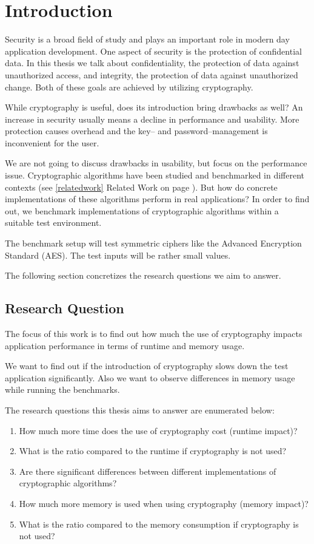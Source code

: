 \chapter{Introduction}

Security is a broad field of study and plays an important role in modern day application development.
One aspect of security is the protection of confidential data.
In this thesis we talk about confidentiality, the protection of data against unauthorized access, and integrity, the protection of data against unauthorized change.
Both of these goals are achieved by utilizing cryptography.

While cryptography is useful, does its introduction bring drawbacks as well?
An increase in security usually means a decline in performance and usability.
More protection causes overhead and the key-- and password--management is inconvenient for the user.

We are not going to discuss drawbacks in usability, but focus on the performance issue.
Cryptographic algorithms have been studied and benchmarked in different contexts (see \ref{relatedwork} Related Work on page \pageref{relatedwork}).
But how do concrete implementations of these algorithms perform in real applications?
In order to find out, we benchmark implementations of cryptographic algorithms within a suitable test environment.

The benchmark setup will test symmetric ciphers like the Advanced Encryption Standard (AES).
The test inputs will be rather small values.

The following section concretizes the research questions we aim to answer.

\section{Research Question}

The focus of this work is to find out how much the use of cryptography
impacts application performance in terms of runtime and memory
usage.

We want to find out if the introduction of cryptography slows down the test application significantly.
Also we want to observe differences in memory usage while running the benchmarks.

The research questions this thesis aims to answer are enumerated below:

\begin{enumerate}
\def\labelenumi{\arabic{enumi}.}
\tightlist
\item
  How much more time does the use of cryptography cost (runtime impact)?
\item
  What is the ratio compared to the runtime if cryptography is not used?
\item
  Are there significant differences between different implementations of cryptographic algorithms?
\item
  How much more memory is used when using cryptography (memory impact)?
\item
  What is the ratio compared to the memory consumption if cryptography
  is not used?
\end{enumerate}

